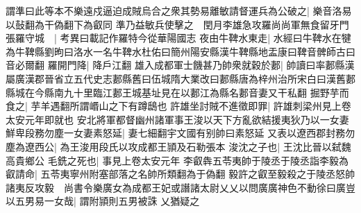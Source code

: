 謂準曰此等本不樂遠戍逼迫成賊烏合之衆其勢易離敏請督運兵為公破之|{
	樂音洛易以鼔翻為干偽翻下為叡同}
準乃益敏兵使擊之　閏月李雄急攻羅尚尚軍無食留牙門張羅守城　|{
	考異曰載記作羅特今從華陽國志}
夜由牛鞞水東走|{
	水經曰牛鞞水在犍為牛鞞縣劉昫曰洛水一名牛鞞水杜佑曰簡州陽安縣漢牛鞞縣地盂康曰鞞音髀師古曰音必爾翻}
羅開門降|{
	降戶江翻}
雄入成都軍士饑甚乃帥衆就穀於郪|{
	帥讀曰率郪縣漢屬廣漢郡晉省立五代史志郪縣舊曰伍城隋大業改曰郪縣唐為梓州治所宋白曰漢舊郪縣城在今縣南九十里臨江郪王城基址見在以郪江為縣名郪音妻又干私翻}
掘野芋而食之|{
	芋羊遇翻所謂㟭山之下有蹲鴟也}
許雄坐討賊不進徵即罪|{
	許雄刺梁州見上卷太安元年即就也}
安北將軍都督幽州諸軍事王浚以天下方亂欲結援夷狄乃以一女妻鮮卑段務勿塵一女妻素怒延|{
	妻七細翻宇文國有别帥曰素怒延}
又表以遼西郡封務勿塵為遼西公|{
	為王浚用段氏以攻成都王頴及石勒張本}
浚沈之子也|{
	王沈比晉以弑魏高貴鄉公}
毛銑之死也|{
	事見上卷太安元年}
李叡犇五苓夷帥于陵丞于陵丞詣李毅為叡請命|{
	五苓夷寧州附塞部落之名帥所類翻為于偽翻}
毅許之叡至毅殺之于陵丞怒帥諸夷反攻毅　尚書令樂廣女為成都王妃或譖諸太尉乂乂以問廣廣神色不動徐曰廣豈以五男易一女哉|{
	謂附頴則五男被誅}
乂猶疑之


